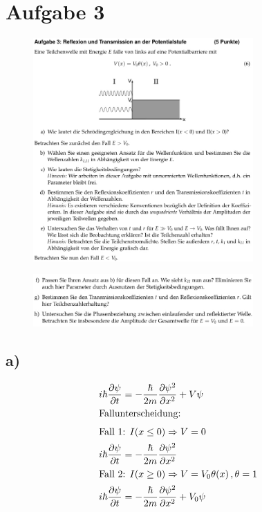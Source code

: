 \section{Aufgabe 3}

\begin{figure}[H]
    \centering
    \includegraphics[width=0.75\textwidth]{./images/Aufgabe3a_e.jpg}
    \label{fig:4}
\end{figure}

\begin{figure}[H]
    \centering
    \includegraphics[width=0.75\textwidth]{./images/Aufgabe3f_h.jpg}
    \label{fig:5}
\end{figure}

\subsection{a)}

    \begin{align*}
        i\hbar \frac{\partial \psi}{\partial t} &= -\frac{\hbar}{2m} \frac{\partial \psi^2}{\partial x^2} + V \psi\\
        \intertext{Fallunterscheidung:
        }
        \intertext{Fall 1: $I(x\leq0) \Rightarrow V=0$
        }
        i\hbar \frac{\partial \psi}{\partial t} &= -\frac{\hbar}{2m} \frac{\partial \psi^2}{\partial x^2}
        \\
        \intertext{Fall 2: $I(x\geq0) \Rightarrow V=V_0\theta(x)\, , \theta=1$
        }
        i\hbar \frac{\partial \psi}{\partial t} &= -\frac{\hbar}{2m} \frac{\partial \psi^2}{\partial x^2} + V_0 \psi
    \end{align*}

